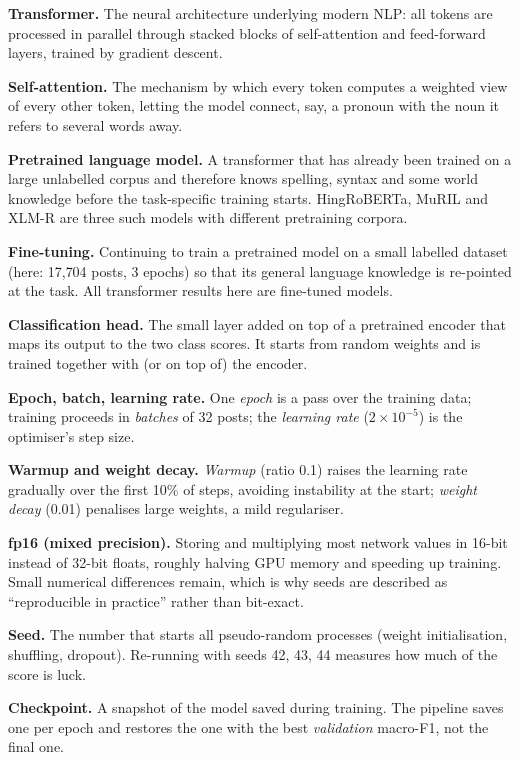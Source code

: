 \textbf{Transformer.} The neural architecture underlying modern NLP: all tokens
are processed in parallel through stacked blocks of self-attention and
feed-forward layers, trained by gradient descent.

\textbf{Self-attention.} The mechanism by which every token computes a weighted
view of every other token, letting the model connect, say, a pronoun with the
noun it refers to several words away.

\textbf{Pretrained language model.} A transformer that has already been trained on
a large unlabelled corpus and therefore knows spelling, syntax and some world
knowledge before the task-specific training starts. HingRoBERTa, MuRIL and XLM-R
are three such models with different pretraining corpora.

\textbf{Fine-tuning.} Continuing to train a pretrained model on a small labelled
dataset (here: 17{,}704 posts, 3 epochs) so that its general language knowledge is
re-pointed at the task. All transformer results here are fine-tuned models.

\textbf{Classification head.} The small layer added on top of a pretrained
encoder that maps its output to the two class scores. It starts from random
weights and is trained together with (or on top of) the encoder.

\textbf{Epoch, batch, learning rate.} One \emph{epoch} is a pass over the
training data; training proceeds in \emph{batches} of 32 posts; the \emph{learning
rate} ($2\times10^{-5}$) is the optimiser's step size.

\textbf{Warmup and weight decay.} \emph{Warmup} (ratio 0.1) raises the learning
rate gradually over the first 10\% of steps, avoiding instability at the start;
\emph{weight decay} (0.01) penalises large weights, a mild regulariser.

\textbf{fp16 (mixed precision).} Storing and multiplying most network values in
16-bit instead of 32-bit floats, roughly halving GPU memory and speeding up
training. Small numerical differences remain, which is why seeds are described as
``reproducible in practice'' rather than bit-exact.

\textbf{Seed.} The number that starts all pseudo-random processes (weight
initialisation, shuffling, dropout). Re-running with seeds 42, 43, 44 measures
how much of the score is luck.

\textbf{Checkpoint.} A snapshot of the model saved during training. The pipeline
saves one per epoch and restores the one with the best \emph{validation} macro-F1,
not the final one.


